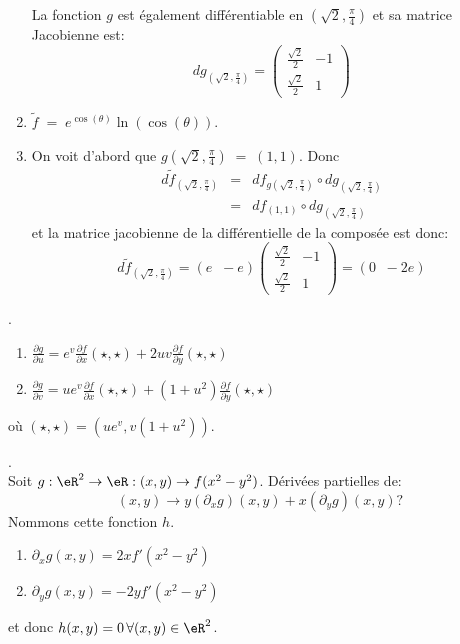 \begin{enumerate}
La fonction $g$ est également différentiable en $(\sqrt2, \frac{\pi}{4})$ et sa matrice Jacobienne est:
\[dg_{(\sqrt2, \frac{\pi}{4})}=\left(\begin{array}{cc} \frac{\sqrt2}{2} & -1\\
    \frac{\sqrt2}{2}&1\end{array}\right)\]  


\item $\tilde{f} \;=\;e^{\cos(\theta)}\ln(\cos(\theta))$.
\item On voit d'abord que $g(\sqrt2, \frac{\pi}{4})\;=\;(1,1)$. Donc
    \[\begin{array}{cccc} d\tilde{f}_{(\sqrt2, \frac{\pi}{4})} & = & df_{g(\sqrt2, \frac{\pi}{4})}\circ dg_{(\sqrt2, \frac{\pi}{4})}\\
        & =& df_{(1,1)}\circ dg_{(\sqrt2, \frac{\pi}{4})} \end{array}\]
                                et  la matrice jacobienne de la différentielle de la composée est donc:\[d\tilde{f}_{(\sqrt2, \frac{\pi}{4})}=(e\;\;-e)\left(\begin{array}{cc} \frac{\sqrt2}{2} & -1\\
                                    \frac{\sqrt2}{2}&1\end{array}\right)=(0\;\;-2e)\]

                                        

\end{enumerate}


.
\begin{enumerate}
    \item $\frac{ \partial g }{ \partial u } = e^v\frac{ \partial f }{ \partial x }(\star,\star)+2uv\frac{ \partial f }{ \partial y }(\star,\star)$
    \item $\frac{ \partial g }{ \partial v } = ue^v\frac{ \partial f }{ \partial x }(\star,\star)+(1+u^2)\frac{ \partial f }{ \partial y }(\star,\star)$
\end{enumerate}
où $(\star,\star) = (ue^v,v(1+u^2))$.

\vspace{1cm}

. \\

\noindent Soit $g:\eR^2\rightarrow \eR:(x,y)\rightarrow  f(x^2-y^2)$. Dérivées partielles de:\[(x,y)\rightarrow  y(\partial_xg)(x,y)+x(\partial_yg)(x,y)?\]
Nommons cette fonction $h$. 
\begin{enumerate}
\item $\partial_xg(x,y) = 2xf'(x^2-y^2)$
\item$\partial_yg(x,y) = -2yf'(x^2-y^2)$
\end{enumerate}
et donc $h(x,y) = 0 \, \forall (x,y)\in \eR^2$.


